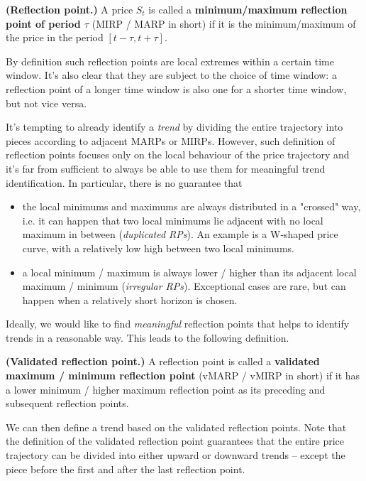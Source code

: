 \begin{definition}
	\label{RP}
	\textbf{(Reflection point.)} A price $S_t$ is called a \textbf{minimum/maximum reflection point of period $\tau$} (MIRP / MARP in short) if it is the minimum/maximum of the price in the period $[t-\tau, t+\tau]$. 
\end{definition}

By definition such reflection points are local extremes within a certain time window. It's also clear that they are subject to the choice of time window: a reflection point of a longer time window is also one for a shorter time window, but not vice versa. 

It's tempting to already identify a \textit{trend} by dividing the entire trajectory into pieces according to adjacent MARPs or MIRPs. However, such definition of reflection points focuses only on the local behaviour of the price trajectory and it's far from sufficient to always be able to use them for meaningful trend identification. In particular, there is no guarantee that 
\begin{itemize}
	\item the local minimums and maximums are always distributed in a "crossed" way, i.e. it can happen that two local minimums lie adjacent with no local maximum in between (\textit{duplicated RPs}). An example is a W-shaped price curve, with a relatively low high between two local minimums.
	\item a local minimum / maximum is always lower / higher than its adjacent local maximum / minimum (\textit{irregular RPs}). Exceptional cases are rare, but can happen when a relatively short horizon is chosen. 
\end{itemize}

Ideally, we would like to find \textit{meaningful} reflection points that helps to identify trends in a reasonable way. This leads to the following definition. 

\begin{definition}
	\label{vRP}
	\textbf{(Validated reflection point.)} A reflection point is called a \textbf{validated maximum / minimum reflection point} (vMARP / vMIRP in short) if it has a lower minimum / higher maximum reflection point as its preceding and subsequent reflection points. 
\end{definition}

We can then define a trend based on the validated reflection points. Note that the definition of the validated reflection point guarantees that the entire price trajectory can be divided into either upward or downward trends -- except the piece before the first and after the last reflection point. 

